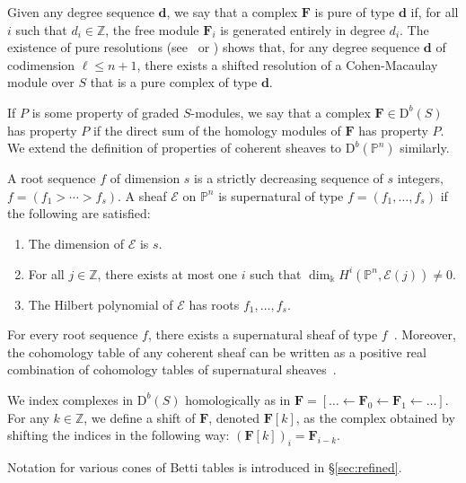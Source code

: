 \documentclass[12pt]{amsart}
\theoremstyle{definition}
\theoremstyle{remark}
\newcommand{\PP}{\mathbb{P}}
\newcommand{\ZZ}{\mathbb{Z}}
\newcommand{\dd}{\mathbf{d}}
\newcommand{\cE}{\mathcal{E}}
\newcommand{\FF}{\mathbf{F}}
\newcommand{\defi}[1]{\textsf{#1}} %
\newcommand{\DD}{\mathrm{D}}
\begin{document}
Given any degree sequence $\dd$, we say that a complex $\FF$ is \defi{pure of type $\dd$} if, for all $i$ such that $d_i\in \ZZ$, the free module $\FF_i$ is generated entirely in degree $d_i$.   The existence of pure resolutions (see~\cite{efw} or \cite[\S5]{eis-schrey1}) shows that, for any  degree sequence $\dd$ of codimension $\ell\leq n+1$, there exists a shifted resolution of a Cohen-Macaulay module over $S$ that is a pure complex of type $\dd$.  

If $P$ is some property of graded $S$-modules, we say that a complex $\FF \in \DD^b(S)$ has property $P$ if the direct sum of the homology modules of $\FF$ has property $P$. We extend the definition of  properties of coherent sheaves to $\DD^b(\PP^n)$ similarly.  

A \defi{root sequence $f$ of dimension $s$} is a strictly decreasing sequence
of $s$ integers, $f=(f_1>\cdots>f_s)$.  
A sheaf $\cE$ on $\PP^{n}$ is
\defi{supernatural of type} $f=(f_1, \dots, f_{s})$ if the following are satisfied: 
\begin{enumerate}
\item The dimension of $\cE$ is $s$.
\item For all $j\in \mathbb Z$, there exists at most one $i$ 
		such that $\dim_\Bbbk H^i(\PP^{n}, \cE(j))\ne 0$.
\item The Hilbert polynomial of $\cE$ has roots $f_1, \dots, f_{s}$.
\end{enumerate}
For every root sequence $f$, there exists a supernatural sheaf of type
$f$~\cite[Theorem~0.4]{eis-schrey1}.
Moreover, the cohomology table of any coherent sheaf 
can be written as a positive real combination of cohomology tables 
of supernatural sheaves~\cite[Theorem~0.1]{eis-schrey2}.  


We index complexes in $\DD^b(S)$ homologically as in $\FF=[\dots \gets \FF_0\gets \FF_1\gets \dots]$.  For any $k\in \ZZ$, we define a \defi{shift} of $\FF$, denoted $\FF[k]$, as the complex obtained by shifting the indices in the following way:  $(\FF[k])_i=\FF_{i-k}$.

Notation for various cones of Betti tables is introduced in \S\ref{sec:refined}.

\end{document}
